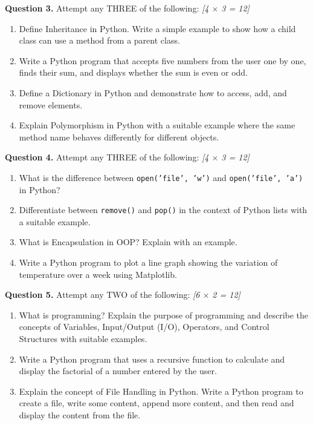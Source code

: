 \documentclass[11pt,a4paper]{article}
\newcommand{\pts}[1]{\hfill \textit{[#1]}}
\begin{document}
\bigskip

\noindent \textbf{Question 3.} Attempt any THREE of the following: \pts{4 $\times$ 3 = 12}
\begin{enumerate}[label=\alph*.]
  \item Define Inheritance in Python. Write a simple example to show how a child class can use a method from a parent class.
  \item Write a Python program that accepts five numbers from the user one by one, finds their sum, and displays whether the sum is even or odd.
  \item Define a Dictionary in Python and demonstrate how to access, add, and remove elements.
  \item Explain Polymorphism in Python with a suitable example where the same method name behaves differently for different objects.
\end{enumerate}

\bigskip

\noindent \textbf{Question 4.} Attempt any THREE of the following: \pts{4 $\times$ 3 = 12}
\begin{enumerate}[label=\alph*.]
  \item What is the difference between \texttt{open('file', 'w')} and \texttt{open('file', 'a')} in Python?
  \item Differentiate between \texttt{remove()} and \texttt{pop()} in the context of Python lists with a suitable example.
  \item What is Encapsulation in OOP? Explain with an example.
  \item Write a Python program to plot a line graph showing the variation of temperature over a week using Matplotlib.
\end{enumerate}

\bigskip

\noindent \textbf{Question 5.} Attempt any TWO of the following: \pts{6 $\times$ 2 = 12}
\begin{enumerate}[label=\alph*.]
  \item What is programming? Explain the purpose of programming and describe the concepts of Variables, Input/Output (I/O), Operators, and Control Structures with suitable examples.
  \item Write a Python program that uses a recursive function to calculate and display the factorial of a number entered by the user.
  \item Explain the concept of File Handling in Python. Write a Python program to create a file, write some content, append more content, and then read and display the content from the file.
\end{enumerate}
\end{document}
